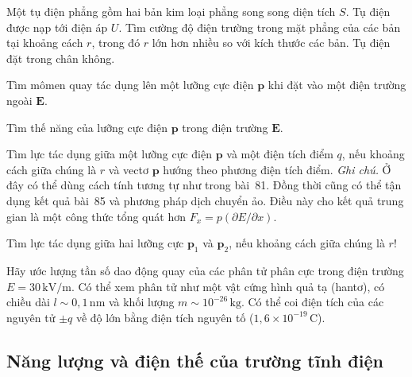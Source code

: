  Một tụ điện phẳng gồm hai bản kim loại phẳng song song diện tích $S$. Tụ điện được nạp tới điện áp $U$. Tìm cường độ điện trường trong mặt phẳng của các bản tại khoảng cách $r$, trong đó $r$ lớn hơn nhiều so với kích thước các bản. Tụ điện đặt trong chân không.


 Tìm mômen quay tác dụng lên một lưỡng cực điện $\mathbf{p}$ khi đặt vào một điện trường ngoài $\mathbf{E}$.


 Tìm thế năng của lưỡng cực điện $\mathbf{p}$ trong điện trường $\mathbf{E}$.


 Tìm lực tác dụng giữa một lưỡng cực điện $\mathbf{p}$ và một điện tích điểm $q$, nếu khoảng cách giữa chúng là $r$ và vectơ $\mathbf{p}$ hướng theo phương điện tích điểm. \emph{Ghi chú.} Ở đây có thể dùng cách tính tương tự như trong bài~81. Đồng thời cũng có thể tận dụng kết quả bài~85 và phương pháp dịch chuyển ảo. Điều này cho kết quả trung gian là một công thức tổng quát hơn $F_x = p(\partial E/\partial x)$.

 Tìm lực tác dụng giữa hai lưỡng cực $\mathbf{p}_1$ và $\mathbf{p}_2$, nếu khoảng cách giữa chúng là $r$!

 Hãy ước lượng tần số dao động quay của các phân tử phân cực trong điện trường $E=30\,\mathrm{kV/m}$. Có thể xem phân tử như một vật cứng hình quả tạ (hantơ), có chiều dài $l\sim 0{,}1\,\mathrm{nm}$ và khối lượng $m\sim 10^{-26}\,\mathrm{kg}$. Có thể coi điện tích của các nguyên tử $\pm q$ về độ lớn bằng điện tích nguyên tố ($1{,}6\times10^{-19}\,\mathrm{C}$).


\subsection{Năng lượng và điện thế của trường tĩnh điện}

